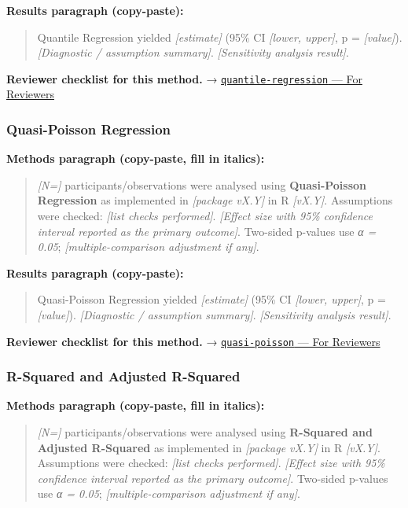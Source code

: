 \documentclass[
]{article}
\begin{document}
\textbf{Results paragraph (copy-paste):}

\begin{quote}
Quantile Regression yielded \emph{{[}estimate{]}} (95\% CI
\emph{{[}lower, upper{]}}, p = \emph{{[}value{]}}). \emph{{[}Diagnostic
/ assumption summary{]}}. \emph{{[}Sensitivity analysis result{]}}.
\end{quote}

\textbf{Reviewer checklist for this method.} →
\href{../chapters/07-regression/quantile-regression.Rmd\#for-reviewers}{\texttt{quantile-regression}
--- For Reviewers}

\subsubsection{Quasi-Poisson Regression}\label{quasi-poisson-regression}

\textbf{Methods paragraph (copy-paste, fill in italics):}

\begin{quote}
\emph{{[}N={]}} participants/observations were analysed using
\textbf{Quasi-Poisson Regression} as implemented in \emph{{[}package
vX.Y{]}} in R \emph{{[}vX.Y{]}}. Assumptions were checked: \emph{{[}list
checks performed{]}}. \emph{{[}Effect size with 95\% confidence interval
reported as the primary outcome{]}}. Two-sided p-values use \emph{α =
0.05}; \emph{{[}multiple-comparison adjustment if any{]}}.
\end{quote}

\textbf{Results paragraph (copy-paste):}

\begin{quote}
Quasi-Poisson Regression yielded \emph{{[}estimate{]}} (95\% CI
\emph{{[}lower, upper{]}}, p = \emph{{[}value{]}}). \emph{{[}Diagnostic
/ assumption summary{]}}. \emph{{[}Sensitivity analysis result{]}}.
\end{quote}

\textbf{Reviewer checklist for this method.} →
\href{../chapters/07-regression/quasi-poisson.Rmd\#for-reviewers}{\texttt{quasi-poisson}
--- For Reviewers}

\subsubsection{R-Squared and Adjusted
R-Squared}\label{r-squared-and-adjusted-r-squared}

\textbf{Methods paragraph (copy-paste, fill in italics):}

\begin{quote}
\emph{{[}N={]}} participants/observations were analysed using
\textbf{R-Squared and Adjusted R-Squared} as implemented in
\emph{{[}package vX.Y{]}} in R \emph{{[}vX.Y{]}}. Assumptions were
checked: \emph{{[}list checks performed{]}}. \emph{{[}Effect size with
95\% confidence interval reported as the primary outcome{]}}. Two-sided
p-values use \emph{α = 0.05}; \emph{{[}multiple-comparison adjustment if
any{]}}.
\end{quote}
\end{document}
